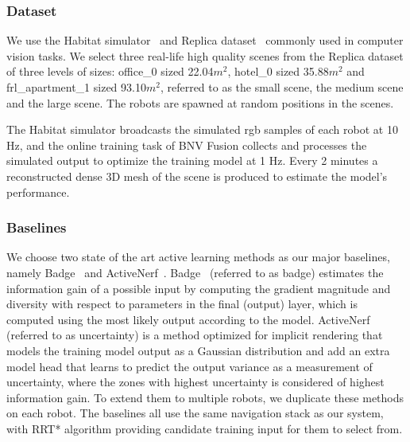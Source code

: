 \subsubsection{Dataset}
We use the Habitat simulator~\cite{szot2021habitat} and Replica dataset~\cite{straub_replica_2019} commonly used in computer vision tasks. 
We select three real-life high quality scenes from the Replica dataset of three levels of sizes: office\_0 sized 22.04$m^2$, hotel\_0 sized 35.88$m^2$ and frl\_apartment\_1 sized 93.10$m^2$, referred to as the small scene, the medium scene and the large scene.
The robots are spawned at random positions in the scenes.

The Habitat simulator broadcasts the simulated rgb samples of each robot at 10 Hz, and the online training task of BNV Fusion collects and processes the simulated output to optimize the training model at 1 Hz.
Every 2 minutes a reconstructed dense 3D mesh of the scene is produced to estimate the model's performance.


\subsubsection{Baselines}
We choose two state of the art active learning methods as our major baselines, namely Badge~\cite{ash_deep_2020} and ActiveNerf~\cite{avidan_activenerf_2022}.
Badge~\cite{ash_deep_2020} (referred to as badge) estimates the information gain of a possible input by computing the gradient magnitude and diversity with respect to parameters in the final (output) layer, which is computed using the most likely output according to the model.
ActiveNerf~\cite{avidan_activenerf_2022} (referred to as uncertainty) is a method optimized for implicit rendering that models the training model output as a Gaussian distribution and add an extra model head that learns to predict the output variance as a measurement of uncertainty, where the zones with highest uncertainty is considered of highest information gain.
To extend them to multiple robots, we duplicate these methods on each robot.
The baselines all use the same navigation stack as our system, with RRT* algorithm providing candidate training input for them to select from.


